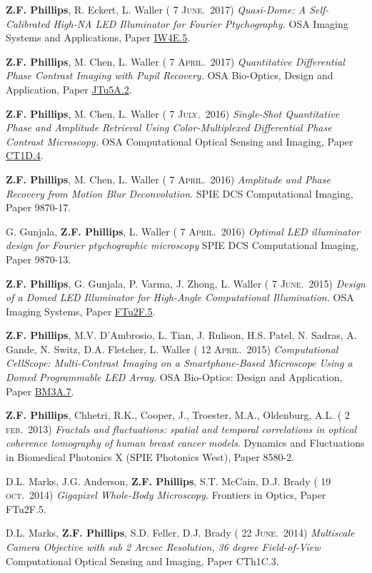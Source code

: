 \documentclass[12pt,letterpaper]{article}
\renewcommand{\date}[1]{{} #1}
\begin{document}
\textbf{Z.F. Phillips}, R. Eckert, L. Waller (\date{7 \textsc{June.}~2017})
\emph{Quasi-Dome: A Self-Calibrated High-NA LED Illuminator for Fourier Ptychography.} OSA Imaging Systems and Applications, Paper \href{https://www.osapublishing.org/abstract.cfm?uri=COSI-2016-CT1D.4}{IW4E.5}.
\medskip

\textbf{Z.F. Phillips}, M. Chen, L. Waller (\date{7 \textsc{April.}~2017})
\emph{Quantitative Differential Phase Contrast Imaging with Pupil Recovery.} OSA Bio-Optics, Design and Application, Paper \href{https://www.osapublishing.org/abstract.cfm?uri=BODA-2017-JTu5A.2}{JTu5A.2}.
\medskip

\textbf{Z.F. Phillips}, M. Chen, L. Waller (\date{7 \textsc{July.}~2016})
\emph{Single-Shot Quantitative Phase and Amplitude Retrieval Using Color-Multiplexed Differential Phase Contrast Microscopy.} OSA Computational Optical Sensing and Imaging, Paper \href{https://www.osapublishing.org/abstract.cfm?uri=COSI-2016-CT1D.4}{CT1D.4}.
\medskip

\textbf{Z.F. Phillips}, M. Chen, L. Waller (\date{7 \textsc{April.}~2016})
\emph{Amplitude and Phase Recovery from Motion Blur Deconvolution.} SPIE DCS Computational Imaging, Paper 9870-17.
\medskip

G. Gunjala, \textbf{Z.F. Phillips}, L. Waller (\date{7 \textsc{April.}~2016})
\emph{Optimal LED illuminator design for Fourier ptychographic microscopy} SPIE DCS Computational Imaging, Paper 9870-13.
\medskip

\textbf{Z.F. Phillips}, G. Gunjala, P. Varma, J. Zhong, L. Waller (\date{7 \textsc{June.}~2015})
\emph{Design of a Domed LED Illuminator for High-Angle Computational Illumination.} OSA Imaging Systems, Paper \href{https://www.osapublishing.org/abstract.cfm?uri=ISA-2015-ITh1A.2}{FTu2F.5}.
\medskip

\textbf{Z.F. Phillips}, M.V. D'Ambrosio, L. Tian, J. Rulison, H.S. Patel, N. Sadras, A. Gande, N. Switz, D.A. Fletcher, L. Waller (\date{12 \textsc{April.}~2015})
\emph{Computational CellScope: Multi-Contrast Imaging on a Smartphone-Based Microscope Using a Domed Programmable LED Array}. OSA Bio-Optics: Design and Application, Paper \href{https://www.osapublishing.org/abstract.cfm?uri=BODA-2015-BM3A.7}{BM3A.7}.
\medskip

\textbf{Z.F. Phillips}, Chhetri, R.K., Cooper, J., Troester, M.A., Oldenburg, A.L. (\date{2 \textsc{feb.}~2013})
\emph{Fractals and fluctuations: spatial and temporal correlations in optical coherence tomography of human breast cancer models}. Dynamics and Fluctuations in Biomedical Photonics X (SPIE Photonics West), Paper 8580-2.
\medskip

D.L. Marks, J.G. Anderson, \textbf{Z.F. Phillips}, S.T. McCain, D.J. Brady (\date{19 \textsc{oct.}~2014})
\emph{Gigapixel Whole-Body Microscopy.} Frontiers in Optics, Paper FTu2F.5.
\medskip

D.L. Marks, \textbf{Z.F. Phillips}, S.D. Feller, D.J. Brady (\date{22 \textsc{June.}~2014})
\emph{Multiscale Camera Objective with sub 2 Arcsec Resolution, 36 degree Field-of-View} Computational Optical Sensing and Imaging, Paper CTh1C.3.
\medskip
\end{document}
